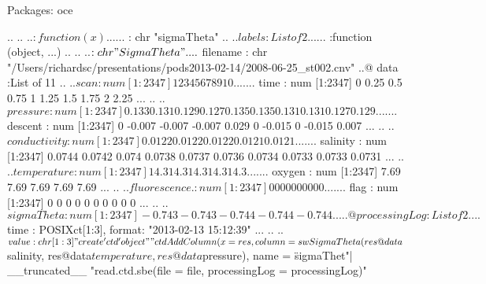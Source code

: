 \documentclass{beamer}
\begin{document}
\begin{frame}[fragile]{Packages: oce}
\begin{Schunk}
\begin{Soutput}
  .. .. ..$ :function (x)  
  .. .. ..$ : chr "sigmaTheta"
  .. ..$ labels          :List of 2
  .. .. ..$ :function (object, ...)  
  .. .. ..$ : chr "Sigma Theta"
  .. ..$ filename        : chr "/Users/richardsc/presentations/pods2013-02-14/2008-06-25_st002.cnv"
  ..@ data         :List of 11
  .. ..$ scan         : num [1:2347] 1 2 3 4 5 6 7 8 9 10 ...
  .. ..$ time         : num [1:2347] 0 0.25 0.5 0.75 1 1.25 1.5 1.75 2 2.25 ...
  .. ..$ pressure     : num [1:2347] 0.133 0.131 0.129 0.127 0.135 0.135 0.131 0.131 0.127 0.129 ...
  .. ..$ descent      : num [1:2347] 0 -0.007 -0.007 -0.007 0.029 0 -0.015 0 -0.015 0.007 ...
  .. ..$ conductivity : num [1:2347] 0.0122 0.0122 0.0122 0.0121 0.0121 ...
  .. ..$ salinity     : num [1:2347] 0.0744 0.0742 0.074 0.0738 0.0737 0.0736 0.0734 0.0733 0.0733 0.0731 ...
  .. ..$ temperature  : num [1:2347] 14.3 14.3 14.3 14.3 14.3 ...
  .. ..$ oxygen       : num [1:2347] 7.69 7.69 7.69 7.69 7.69 ...
  .. ..$ fluorescence.: num [1:2347] 0 0 0 0 0 0 0 0 0 0 ...
  .. ..$ flag         : num [1:2347] 0 0 0 0 0 0 0 0 0 0 ...
  .. ..$ sigmaTheta   : num [1:2347] -0.743 -0.743 -0.744 -0.744 -0.744 ...
  ..@ processingLog:List of 2
  .. ..$ time : POSIXct[1:3], format: "2013-02-13 15:12:39" ...
  .. ..$ value: chr [1:3] "create 'ctd' object" "ctdAddColumn(x = res, column = swSigmaTheta(res@data$salinity,     res@data$temperature, res@data$pressure), name = \"sigmaThet"| __truncated__ "read.ctd.sbe(file = file, processingLog = processingLog)"
\end{Soutput}
\end{Schunk}

\end{frame}
\end{document}
